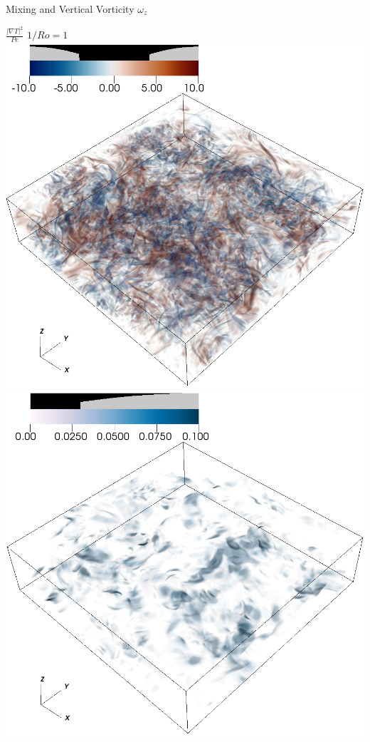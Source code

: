 \documentclass[aspecttatio=169]{beamer}
\begin{document}
\begin{frame}{Mixing and Vertical Vorticity}
    \centering
        $\omega_z$

        \vspace{75pt}

        $\frac{|\nabla T|^2}{Pe}$
    \emp
        \centering
        $1/Ro = 1$
        \includegraphics[width=.95\textwidth]{images/vortz_Om0.5_vr2.png}
        \includegraphics[width=.95\textwidth]{images/chi_Om0.5_vr2.png}

\end{frame}
\end{document}
